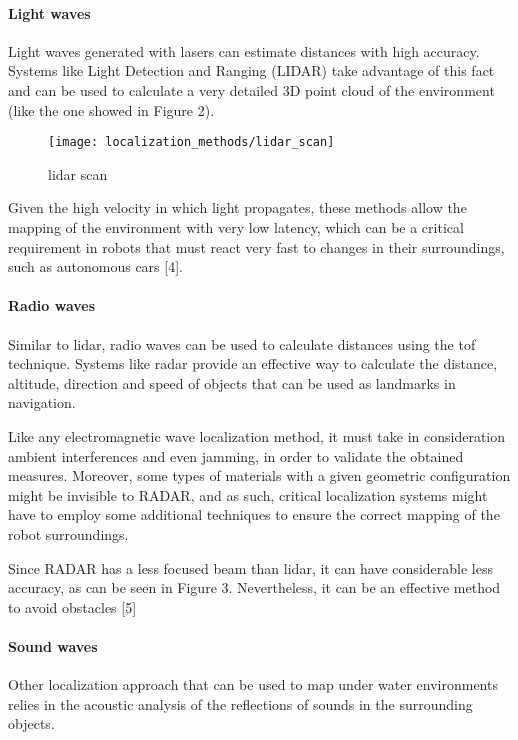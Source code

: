\paragraph{Light waves}

Light waves generated with lasers can estimate distances with high accuracy. Systems like Light Detection and Ranging (LIDAR) take advantage of this fact and can be used to calculate a very detailed 3D point cloud of the environment (like the one showed in Figure 2).

\begin{figure}[h]
	\centering
	\texttt{[image: localization\_methods/lidar\_scan]}
	\caption{\gls{lidar} scan}
	\label{fig:localization-methods_lidar-scan}
\end{figure}

Given the high velocity in which light propagates, these methods allow the mapping of the environment with very low latency, which can be a critical requirement in robots that must react very fast to changes in their surroundings, such as autonomous cars [4].

\paragraph{Radio waves}

Similar to \gls{lidar}, radio waves can be used to calculate distances using the \gls{tof} technique. Systems like \gls{radar} provide an effective way to calculate the distance, altitude, direction and speed of objects that can be used as landmarks in navigation.

Like any electromagnetic wave localization method, it must take in consideration ambient interferences and even jamming, in order to validate the obtained measures. Moreover, some types of materials with a given geometric configuration might be invisible to RADAR, and as such, critical localization systems might have to employ some additional techniques to ensure the correct mapping of the robot surroundings.

Since RADAR has a less focused beam than \gls{lidar}, it can have considerable less accuracy, as can be seen in Figure 3. Nevertheless, it can be an effective method to avoid obstacles [5]

\paragraph{Sound waves}

Other localization approach that can be used to map under water environments relies in the acoustic analysis of the reflections of sounds in the surrounding objects.

